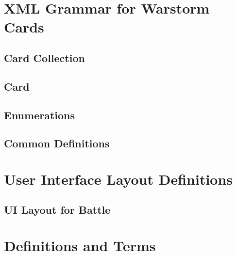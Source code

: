 \documentclass[10pt,oneside,a4paper]{skh-scrreprt}
\begin{document}
\chapter{XML Grammar for Warstorm Cards}\label{chap:ws-card-vocab}


\section{Card Collection}


\section{Card}


\section{Enumerations}


\section{Common Definitions}


\chapter{User Interface Layout Definitions}

\section{UI Layout for Battle}


\chapter{Definitions and Terms}\label{chap:glossaries}
\printglossaries

\begin{versionhistory}
\end{versionhistory}

\printindex

\cite{bray_namespaces_2009}
\cite{bray_extensible_2008}
\cite{burbeck_applications_1987}
\cite{fokker_functional_1995}
\cite{clark_xml_1999}
\cite{clark_xsl_1999}
\cite{clark_relax_2002}
\cite{clark_relax_2002-1}
\cite{dijkstra_role_1982}
\cite{kobayashi_scheme_2006}
\cite{flatt_reference:_2011}
\cite{flatt_gui:_2011}
\cite{gamma_design_1995}
\cite{international_telecommunication_union_information_1993}

\label{sec:refs}

\end{document}

